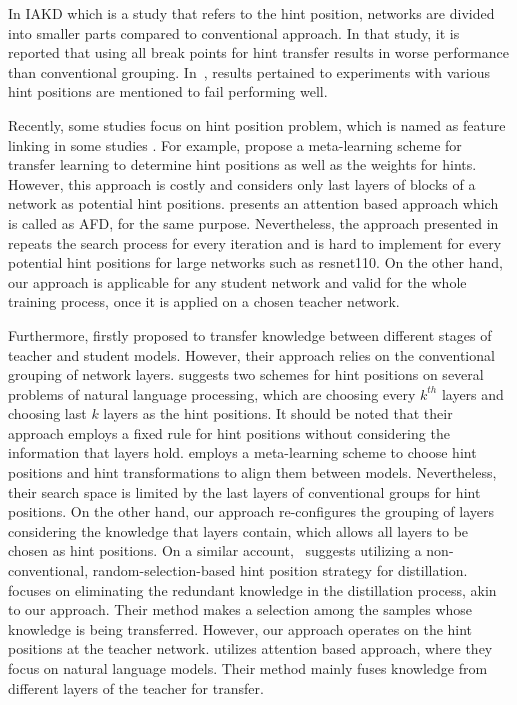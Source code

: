 \documentclass[final,3p,times]{elsarticle}
\begin{document}
In IAKD \citep{fu2021interactive} which is a study that refers to the hint position, networks are divided into smaller parts compared to conventional approach. In that study, it is reported that using all break points for hint transfer results in worse performance than conventional grouping. In~\citep{ruffy2019state}, results pertained to experiments with various hint positions are mentioned to fail performing well. 

Recently, some studies focus on hint position problem, which is named as feature linking in some studies \citep{ji2021show}. For example, \citep{jang2019learning} propose a meta-learning scheme for transfer learning to determine hint positions as well as the weights for hints. However, this approach is costly and considers only last layers of blocks of a network as potential hint positions. \citep{ji2021show} presents an attention based approach which is called as AFD, for the same purpose. Nevertheless, the approach presented in \citep{ji2021show} repeats the search process for every iteration and is hard to implement for every potential hint positions for large networks such as resnet110. On the other hand, our approach is applicable for any student network and valid for the whole training process, once it is applied on a chosen teacher network. 

Furthermore, \citep{chen2021distilling} firstly proposed to transfer knowledge between different stages of teacher and student models. However, their approach relies on the conventional grouping of network layers. \citep{sun2019patient} suggests two schemes for hint positions on several problems of natural language processing, which are choosing every $k^{th}$ layers and choosing last $k$ layers as the hint positions. It should be noted that their approach employs a fixed rule for hint positions without considering the information that layers hold. \citep{deng2022distpro} employs a meta-learning scheme to choose hint positions and hint transformations to align them between models. Nevertheless, their search space is limited by the last layers of conventional groups for hint positions. On the other hand, our approach re-configures the grouping of layers considering the knowledge that layers contain, which allows all layers to be chosen as hint positions.
On a similar account,~\citep{haidar2021rail}  suggests utilizing a non-conventional, random-selection-based hint position strategy for distillation.~\citep{li2022knowledge} focuses on eliminating the redundant knowledge in the distillation process, akin to our approach. Their method makes a selection among the samples whose knowledge is being transferred. However, our approach operates on the hint positions at the teacher network. 
\citep{passban2021alp} utilizes attention based approach, where they focus on natural language models. Their method mainly fuses knowledge from different layers of the teacher for transfer. 
\end{document}
